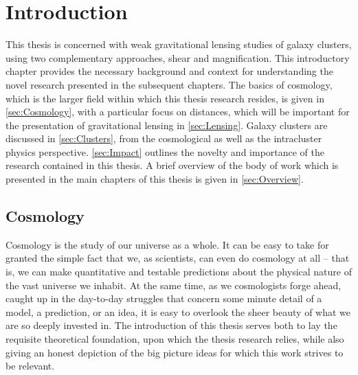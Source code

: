 
\chapter{Introduction}
\label{ch:Introduction}



This thesis is concerned with weak gravitational lensing studies of galaxy clusters, using two complementary approaches, shear and magnification. This introductory chapter provides the necessary background and context for understanding the novel research presented in the subsequent chapters. The basics of cosmology, which is the larger field within which this thesis research resides, is given in \autoref{sec:Cosmology}, with a particular focus on distances, which will be important for the presentation of gravitational lensing in \autoref{sec:Lensing}. Galaxy clusters are discussed in \autoref{sec:Clusters}, from the cosmological as well as the intracluster physics perspective. \autoref{sec:Impact} outlines the novelty and importance of the research contained in this thesis. A brief overview of the body of work which is presented in the main chapters of this thesis is given in \autoref{sec:Overview}.

\section{Cosmology}
\label{sec:Cosmology}

Cosmology is the study of our universe as a whole. It can be easy to take for granted the simple fact that we, as scientists, can even do cosmology at all -- that is, we can make quantitative and testable predictions about the physical nature of the vast universe we inhabit. At the same time, as we cosmologists forge ahead, caught up in the day-to-day struggles that concern some minute detail of a model, a prediction, or an idea, it is easy to overlook the sheer beauty of what we are so deeply invested in. The introduction of this thesis serves both to lay the requisite theoretical foundation, upon which the thesis research relies, while also giving an honest depiction of the big picture ideas for which this work strives to be relevant.


